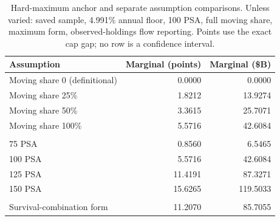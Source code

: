 \begin{table}[H]
\centering\small
\caption{Hard-maximum anchor and separate assumption comparisons. Unless varied: saved sample, 4.991\% annual floor, 100 PSA, full moving share, maximum form, observed-holdings flow reporting. Points use the exact cap gap; no row is a confidence interval.}
\label{tab:mainresults}
\begin{tabular}{@{}p{8cm}rr@{}}\toprule
Assumption & Marginal (points) & Marginal (\$B)\\\midrule
Moving share 0 (definitional) & 0.0000 & 0.0000\\
Moving share 25\% & 1.8212 & 13.9274\\
Moving share 50\% & 3.3615 & 25.7071\\
Moving share 100\% & 5.5716 & 42.6084\\
\addlinespace\\
75 PSA & 0.8560 & 6.5465\\
100 PSA & 5.5716 & 42.6084\\
125 PSA & 11.4191 & 87.3271\\
150 PSA & 15.6265 & 119.5033\\
\addlinespace\\
Survival-combination form & 11.2070 & 85.7055\\
\bottomrule
\end{tabular}
\end{table}
